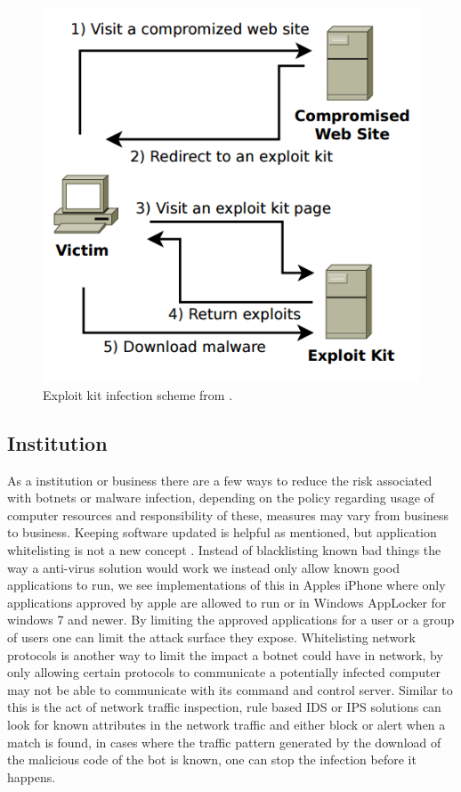 \begin{figure}
	\centering
	\includegraphics[scale=0.4]{fig/jan-ek-inf}
	\caption{Exploit kit infection scheme from \cite{jan-kotov-ek}.}
	\label{jan-ek-infection}
\end{figure}

\subsection{Institution}%
As a institution or business there are a few ways to reduce the risk associated with botnets or malware infection, depending on the policy regarding usage of computer resources and responsibility of these, measures may vary from business to business.
Keeping software updated is helpful as mentioned, but application whitelisting is not a new concept \cite{jan-mansfield-whitelist}. Instead of blacklisting known bad things the way a anti-virus solution would work we instead only allow known good applications to run, we see implementations of this in Apples iPhone where only applications approved by apple are allowed to run or in Windows AppLocker \cite{jan-windows-applocker} for windows 7 and newer. By limiting the approved applications for a user or a group of users one can limit the attack surface they expose.
Whitelisting network protocols is another way to limit the impact a botnet could have in network, by only allowing certain protocols to communicate a potentially infected computer may not be able to communicate with its command and control server. Similar to this is the act of network traffic inspection, rule based IDS or IPS solutions can look for known attributes in the network traffic and either block or alert when a match is found, in cases where the traffic pattern generated by the download of the malicious code of the bot is known, one can stop the infection before it happens. 




